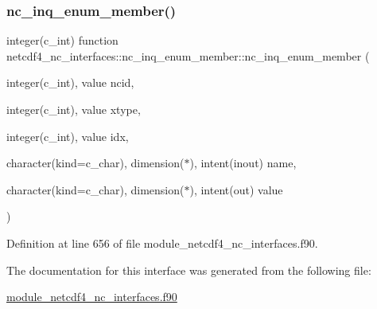 \subsubsection{\texorpdfstring{nc\+\_\+inq\+\_\+enum\+\_\+member()}{nc\_inq\_enum\_member()}}
{\footnotesize\ttfamily integer(c\+\_\+int) function netcdf4\+\_\+nc\+\_\+interfaces\+::nc\+\_\+inq\+\_\+enum\+\_\+member\+::nc\+\_\+inq\+\_\+enum\+\_\+member (\begin{DoxyParamCaption}\item[{integer(c\+\_\+int), value}]{ncid,  }\item[{integer(c\+\_\+int), value}]{xtype,  }\item[{integer(c\+\_\+int), value}]{idx,  }\item[{character(kind=c\+\_\+char), dimension($\ast$), intent(inout)}]{name,  }\item[{character(kind=c\+\_\+char), dimension($\ast$), intent(out)}]{value }\end{DoxyParamCaption})}



Definition at line 656 of file module\+\_\+netcdf4\+\_\+nc\+\_\+interfaces.\+f90.



The documentation for this interface was generated from the following file\+:\begin{DoxyCompactItemize}
\item 
\hyperlink{module__netcdf4__nc__interfaces_8f90}{module\+\_\+netcdf4\+\_\+nc\+\_\+interfaces.\+f90}\end{DoxyCompactItemize}
